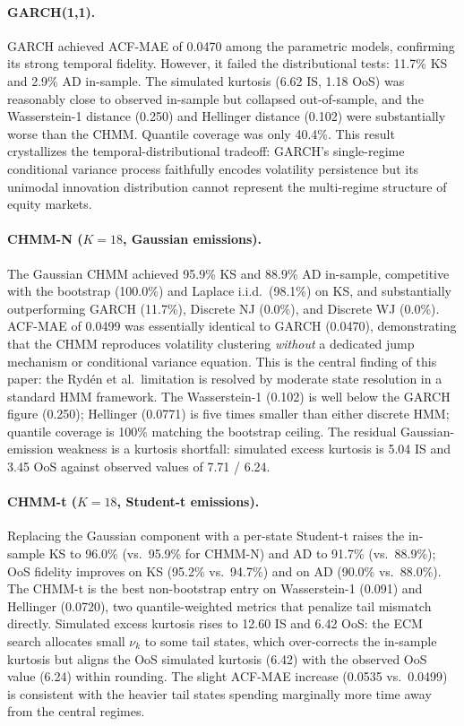 \paragraph{GARCH(1,1).}
GARCH achieved ACF-MAE of 0.0470 among the parametric models, confirming its strong temporal fidelity.
However, it failed the distributional tests: 11.7\% KS and 2.9\% AD in-sample.
The simulated kurtosis (6.62 IS, 1.18 OoS) was reasonably close to observed in-sample but collapsed out-of-sample, and the Wasserstein-1 distance (0.250) and Hellinger distance (0.102) were substantially worse than the CHMM.
Quantile coverage was only 40.4\%.
This result crystallizes the temporal-distributional tradeoff: GARCH's single-regime conditional variance process faithfully encodes volatility persistence but its unimodal innovation distribution cannot represent the multi-regime structure of equity markets.

\paragraph{CHMM-N ($K = 18$, Gaussian emissions).}
The Gaussian CHMM achieved 95.9\% KS and 88.9\% AD in-sample, competitive with the bootstrap (100.0\%) and Laplace i.i.d.\ (98.1\%) on KS, and substantially outperforming GARCH (11.7\%), Discrete NJ (0.0\%), and Discrete WJ (0.0\%).
ACF-MAE of 0.0499 was essentially identical to GARCH (0.0470), demonstrating that the CHMM reproduces volatility clustering \emph{without} a dedicated jump mechanism or conditional variance equation.
This is the central finding of this paper: the Ryd\'{e}n et al.\ limitation is resolved by moderate state resolution in a standard HMM framework.
The Wasserstein-1 (0.102) is well below the GARCH figure (0.250); Hellinger (0.0771) is five times smaller than either discrete HMM; quantile coverage is 100\% matching the bootstrap ceiling.
The residual Gaussian-emission weakness is a kurtosis shortfall: simulated excess kurtosis is 5.04 IS and 3.45 OoS against observed values of 7.71 / 6.24.

\paragraph{CHMM-t ($K = 18$, Student-t emissions).}
Replacing the Gaussian component with a per-state Student-t raises the in-sample KS to 96.0\% (vs.\ 95.9\% for CHMM-N) and AD to 91.7\% (vs.\ 88.9\%); OoS fidelity improves on KS (95.2\% vs.\ 94.7\%) and on AD (90.0\% vs.\ 88.0\%).
The CHMM-t is the best non-bootstrap entry on Wasserstein-1 (0.091) and Hellinger (0.0720), two quantile-weighted metrics that penalize tail mismatch directly.
Simulated excess kurtosis rises to 12.60 IS and 6.42 OoS: the ECM search allocates small $\nu_k$ to some tail states, which over-corrects the in-sample kurtosis but aligns the OoS simulated kurtosis (6.42) with the observed OoS value (6.24) within rounding.
The slight ACF-MAE increase (0.0535 vs.\ 0.0499) is consistent with the heavier tail states spending marginally more time away from the central regimes.

